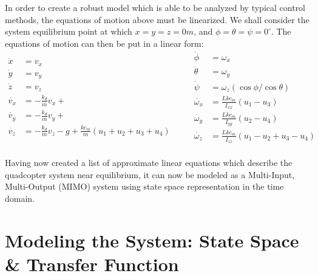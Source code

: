 \documentclass[12pt]{article}
\begin{document}
In order to create a robust model which is able to be analyzed by typical control methods, 
the equations of motion above must be linearized. We shall consider the 
system equilibrium point at which $x = y = z = 0m$, and $\phi = \theta = \psi = 0^{\circ}$.
The equations of motion can then be put in a linear form:
\begin{equation*}
  \begin{split}
    \dot{x} &= v_x \\
    \dot{y} &= v_y \\
    \dot{z} &= v_z \\
    \dot{v_x} &= -\frac{k_d}{m}v_x +  \\
    \dot{v_y} &= -\frac{k_d}{m}v_y + \\
    \dot{v_z} &= -\frac{k_d}{m}v_z -g + \frac{kc_m}{m}(u_1 + u_2 + u_3 + u_4) \\
  \end{split}
\quad\quad
  \begin{split}
    \dot{\phi} &= \omega_x  \\
    \dot{\theta} &= \omega_y \\
    \dot{\psi} &= \omega_z(\cos\phi/\cos\theta) \\
    \dot{\omega_x} &= \frac{Lkc_m}{I_{xx}}(u_1 - u_3) \\
    \dot{\omega_y} &= \frac{Lkc_m}{I_{yy}}(u_2 - u_4)  \\
    \dot{\omega_z} &= \frac{Lkc_m}{I_{zz}}(u_1 - u_2 + u_3 - u_4) \\
  \end{split}
\end{equation*}

Having now created a list of approximate linear equations which describe the 
quadcopter system near equilibrium, it can now be modeled as a Multi-Input, Multi-Output
(MIMO) system using state space representation in the time domain. 

\section*{Modeling the System: State Space \& Transfer Function}
\end{document}
